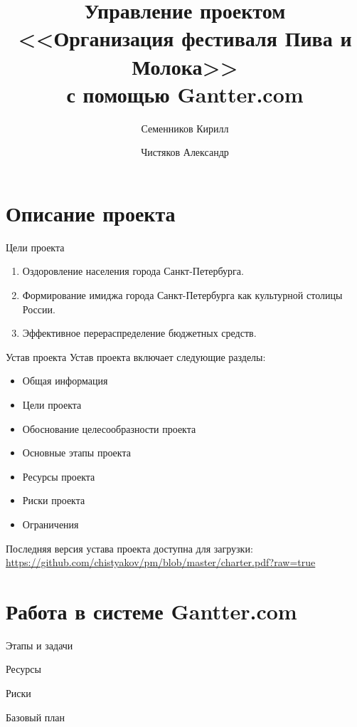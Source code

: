 \documentclass[10pt,pdf,hyperref=unicode,hyperref={bookmarks=false}]{beamer}
\title[Организация фестиваля Пива и Молока]{Управление проектом\\ <<Организация фестиваля Пива и Молока>>\\ с помощью Gantter.com}
\author{Семенников Кирилл\and Чистяков Александр}
\institute{Санкт-Петербургский национальный исследовательский университет информационных технологий, механики и оптики}
\begin{document}
  \begin{frame}
    \maketitle
  \end{frame}
  \section{Описание проекта}
    \begin{frame}{Цели проекта}
      \begin{enumerate}
        \item{Оздоровление населения города Санкт-Петербурга.}
        \item{Формирование имиджа города Санкт-Петербурга как культурной столицы России.}
        \item{Эффективное перераспределение бюджетных средств.}
      \end{enumerate}
    \end{frame} 
    \begin{frame}{Устав проекта}
      Устав проекта включает следующие разделы:
      \begin{itemize}
        \item Общая информация
        \item Цели проекта
        \item Обоснование целесообразности проекта
        \item Основные этапы проекта
        \item Ресурсы проекта
        \item Риски проекта
        \item Ограничения
      \end{itemize}

      Последняя версия устава проекта доступна для загрузки:\\
      \href{https://github.com/chistyakov/pm/blob/master/charter.pdf?raw=true}{https://github.com/chistyakov/pm/blob/master/charter.pdf?raw=true}
    \end{frame}
  \section{Работа в системе Gantter.com}
    \begin{frame}{Этапы и задачи}
    \end{frame}
    \begin{frame}{Ресурсы}
    \end{frame}
    \begin{frame}{Риски}
    \end{frame}
    \begin{frame}{Базовый план}
    \end{frame}
\end{document}
